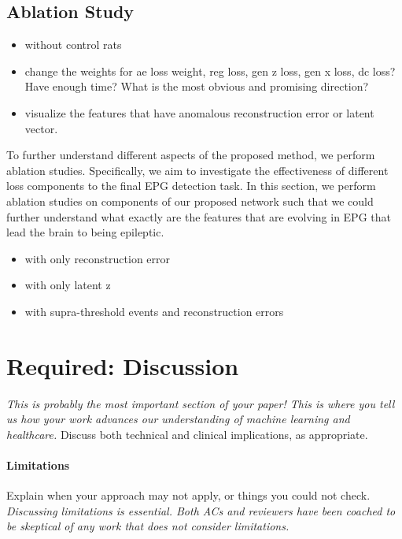 \documentclass[pmlr]{jmlr}%
\begin{document}
\subsection{Ablation Study}
\begin{itemize}
	\item without control rats
	\item change the weights for ae loss weight, reg loss, gen z loss, gen x loss, dc loss? Have enough time? What is the most obvious and promising direction?
	\item visualize the features that have anomalous reconstruction error or latent vector.
\end{itemize}


To further understand different aspects of the proposed method, we perform ablation studies. Specifically, we aim to investigate the effectiveness of different loss components to the final EPG detection task. In this section, we perform ablation studies on components of our proposed network such that we could further understand what exactly are the features that are evolving in EPG that lead the brain to being epileptic.
\begin{itemize}
	\item with only reconstruction error
	\item with only latent z
	\item with supra-threshold events and reconstruction errors
\end{itemize}


\section{Required: Discussion} 

\emph{This is probably the most important section of your paper!  This
	is where you tell us how your work advances our understanding of
	machine learning and healthcare.}  Discuss both technical and
clinical implications, as appropriate.

\paragraph{Limitations}

Explain when your approach may not apply, or things you could not
check.  \emph{Discussing limitations is essential.  Both ACs and
	reviewers have been coached to be skeptical of any work that does
	not consider limitations.}





\end{document}
